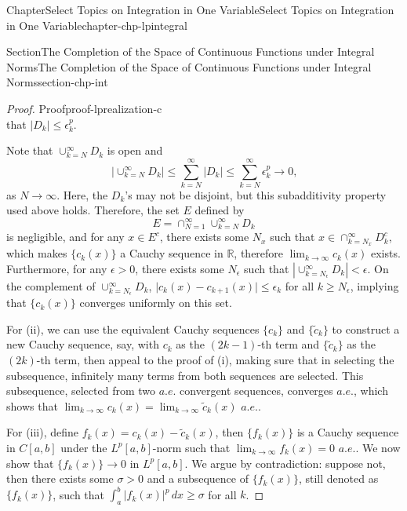 \documentclass[oneside,10pt,]{book}
\numberwithin{equation}{section}
\newcommand{\bbR}{\mathbb{R}}
\begin{document}
\begin{chapterptx}{Chapter}{Select Topics on Integration in One Variable}{}{Select Topics on Integration in One Variable}{}{}{chapter-chp-lpintegral}
\begin{sectionptx}{Section}{The Completion of the Space of Continuous Functions under Integral Norms}{}{The Completion of the Space of Continuous Functions under Integral Norms}{}{}{section-chp-int}
\begin{proof}{Proof}{}{proof-lprealization-c}
\begin{equation*}
\end{equation*}
that \(|D_{k}|\le  \epsilon_{k}^{p}\).%
\par
Note that \(\cup_{k=N}^{\infty}D_{k}\) is open and%
\begin{equation*}
|\cup_{k=N}^{\infty}D_{k}|\le 
\sum_{k=N}^{\infty}|D_{k}| \le \sum_{k=N}^{\infty}\epsilon_{k}^{p}\to 0\text{,}
\end{equation*}
as \(N\to\infty\). Here, the \(D_{k}\)'s may not be disjoint, but this subadditivity property used above holds. Therefore, the set \(E\)\footnotemark{} defined by%
\begin{equation*}
E=\cap_{N=1}^{\infty}  \cup_{k=N}^{\infty}D_{k}
\end{equation*}
is negligible, and for any \(x\in E^{c}\), there exists some \(N_{x}\) such that \(x\in \cap_{k=N_{x}}^{\infty}D_{k}^{c}\), which makes \(\{c_{k}(x)\}\) a Cauchy sequence in \(\bbR\), therefore \(\lim_{k\to\infty} c_{k}(x)\) exists. Furthermore, for any \(\epsilon > 0\), there exists some \(N_{\epsilon}\) such that \(|\cup_{k=N_{\epsilon}}^{\infty}D_{k}| < \epsilon\). On the complement of \(\cup_{k=N_{\epsilon}}^{\infty}D_{k}\), \(\vert c_{k}(x) -c_{k+1}(x)\vert \le \epsilon_{k}\) for all \(k\ge N_{\epsilon}\), implying that \(\{c_{k}(x)\}\) converges uniformly on this set.%
\par
For (ii), we can use the equivalent Cauchy sequences \(\{ c_{k}\}\) and \(\{ \tilde c_{k}\}\) to construct a new Cauchy sequence, say, with \(c_{k}\) as the \((2k-1)\)-th term and \(\{ \tilde c_{k}\}\) as the \((2k)\)-th term, then appeal to the proof of (i), making sure that in selecting the subsequence, infinitely many terms from both sequences are selected. This subsequence, selected from two \(a.e.\) convergent  sequences, converges \(a.e.\), which shows that \(\lim_{k\to \infty} c_{k}(x)=\lim_{k\to \infty} \tilde c_{k}(x)\) \(a.e. \).%
\par
For (iii), define \(f_{k}(x)=c_{k}(x)-\tilde c_{k}(x)\), then \(\{f_{k}(x)\}\) is a Cauchy sequence  in \(C[a, b]\) under the \(L^{p}[a,  b]\)-norm such that \(\lim_{k\to\infty} f_{k}(x)=0\) \(a.e.\). We now show that \(\{f_{k}(x)\}\to 0\) in \(L^{p}[a, b]\). We argue by contradiction: suppose not, then there exists some \(\sigma > 0\) and a subsequence of \(\{f_{k}(x)\}\), still denoted as \(\{f_{k}(x)\}\), such that \(\int_{a}^{b} |f_{k}(x)|^{p}\, dx \ge \sigma\) for all \(k\).%
\par

\end{proof}
\end{sectionptx}
\end{chapterptx}
\end{document}
